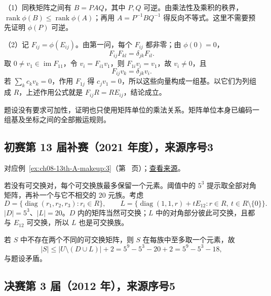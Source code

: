 \documentclass[12pt,fontset=fandol]{ctexart}
\begin{document}
\begin{solve}

（1）同秩矩阵之间有 $B=PAQ$，其中 $P,Q$ 可逆。由乘法性及乘积的秩界，$\operatorname{rank}\phi(B)\le\operatorname{rank}\phi(A)$；再用 $A=P^{-1}BQ^{-1}$ 得反向不等式。这里不需要预先证明 $\phi(P)$ 可逆。

（2）记 $F_{ij}=\phi(E_{ij})$。由第一问，每个 $F_{ij}$ 都非零；由 $\phi(0)=0$，
\[
F_{ij}F_{kl}=\delta_{jk}F_{il}.
\]
取 $0\ne v_1\in\operatorname{im}F_{11}$，令 $v_i=F_{i1}v_1$，则 $F_{1i}v_i=v_1$，故 $v_i\ne0$，且
\[
F_{ij}v_k=\delta_{jk}v_i.
\]
若 $\sum_kc_kv_k=0$，作用 $F_{1j}$ 得 $c_jv_1=0$，所以这些向量构成一组基。以它们为列组成 $R$，上述作用公式就是 $F_{ij}R=RE_{ij}$，结论成立。

\end{solve}

\begin{remark}[方法与条件]

题设没有要求可加性，证明也只使用矩阵单位的乘法关系。矩阵单位本身已编码一组基及坐标之间的全部搬运规则。

\end{remark}

\subsection{初赛第 13 届补赛（2021 年度），来源序号3}\label{ans:ch08-13th-A-makeup:3}\label{pr:ch08-13th-A-makeup:3}

对应例~\ref{ex:ch08-13th-A-makeup:3}（第~\pageref{ex:ch08-13th-A-makeup:3} 页）；\href{https://github.com/lzxcr/cmc-mathematics/blob/64916fa1fdbc3e444a652eca204d5669058ee321/src/problems/preliminary/13-makeup/03.md}{查看来源}。

\begin{solve}

若没有可交换对，每个可交换族最多保留一个元素。阈值中的 $5^3$ 提示取全部对角矩阵，再补一个与它不相交的 $20$ 元族。考虑
\[
D=\{\operatorname{diag}(r_1,r_2,r_3):r_i\in R\},
\qquad
L=\{\operatorname{diag}(1,1,r)+tE_{12}:
 r\in R,\ t\in R\setminus\{0\}\}.
\]
$|D|=5^3$、$|L|=20$。$D$ 内的矩阵当然可交换；$L$ 中的对角部分彼此可交换，且都与 $E_{12}$ 可交换，所以 $L$ 也是可交换族。

若 $S$ 中不存在两个不同的可交换矩阵，则 $S$ 在每族中至多取一个元素，故
\[
|S|\leq |U\setminus(D\cup L)|+2
=5^9-5^3-20+2=5^9-5^3-18,
\]
与题设矛盾。

\end{solve}

\subsection{决赛第 3 届（2012 年），来源序号5}\label{ans:fin03-all:5}\label{pr:fin03-all:5}
\end{document}
